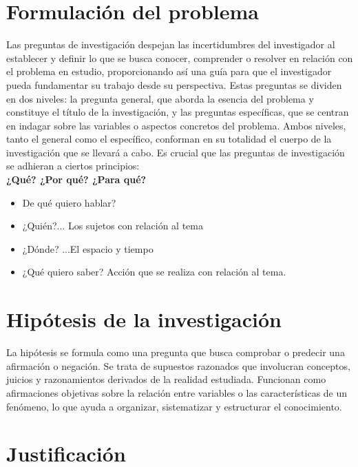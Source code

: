 \documentclass[12pt,a4paper,oneside]{report}
\begin{document}
\section{Formulación del problema}

Las preguntas de investigación despejan las incertidumbres del investigador al establecer y definir lo que se busca conocer, comprender o resolver en relación con el problema en estudio, proporcionando así una guía para que el investigador pueda fundamentar su trabajo desde su perspectiva. Estas preguntas se dividen en dos niveles: la pregunta general, que aborda la esencia del problema y constituye el título de la investigación, y las preguntas específicas, que se centran en indagar sobre las variables o aspectos concretos del problema. Ambos niveles, tanto el general como el específico, conforman en su totalidad el cuerpo de la investigación que se llevará a cabo. Es crucial que las preguntas de investigación se adhieran a ciertos principios:\\

\textbf{¿Qué? ¿Por qué? ¿Para qué?}\\

\begin{itemize}
    \item De qué quiero hablar? 
    \item ¿Quién?... Los sujetos con relación al tema 
    \item ¿Dónde? ...El espacio y tiempo 
    \item ¿Qué quiero saber? Acción que se realiza con relación al tema.
\end{itemize}


\section{Hipótesis de la investigación}

La hipótesis se formula como una pregunta que busca comprobar o predecir una afirmación o negación. Se trata de supuestos razonados que involucran conceptos, juicios y razonamientos derivados de la realidad estudiada. Funcionan como afirmaciones objetivas sobre la relación entre variables o las características de un fenómeno, lo que ayuda a organizar, sistematizar y estructurar el conocimiento.

\section{Justificación}
\end{document}
